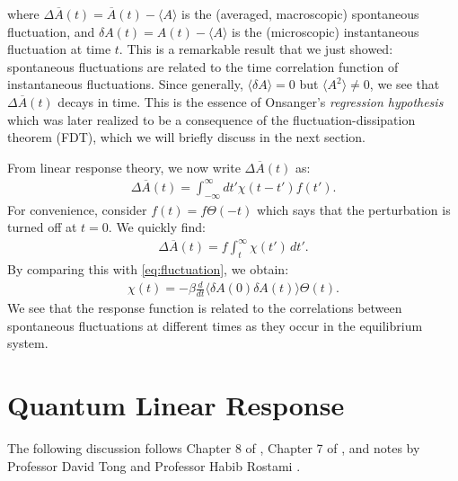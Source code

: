 \documentclass[prl,
twocolumn,
nofootinbib,
amsmath,amssymb,
aps]{revtex4-1}
\newcommand{\be}{\beta}
\newcommand{\f}[2]{\frac{#1}{#2}}
\begin{document}
where $\Delta \overline{A}(t) = \overline{A}(t) - \langle A \rangle$ is the (averaged, macroscopic) spontaneous fluctuation, and $\delta A(t) = A(t) - \langle A \rangle$ is the (microscopic) instantaneous fluctuation at time $t$. This is a remarkable result that we just showed: spontaneous fluctuations are related to the time correlation function of instantaneous fluctuations. Since generally, $\langle \delta A \rangle = 0$ but $\langle A^2 \rangle \neq 0$, we see that $\Delta \overline{A}(t)$ decays in time. This is the essence of Onsanger's \textit{regression hypothesis} which was later realized to be a consequence of the fluctuation-dissipation theorem (FDT), which we will briefly discuss in the next section.

From linear response theory, we now write $\Delta \overline{A}(t)$ as:
\begin{align}
\label{eq:fluctuation_response_function}
\Delta \overline{A}(t) = \int_{-\infty}^\infty dt' \chi(t-t') f(t'). 
\end{align}
For convenience, consider $f(t) = f \Theta(-t)$ which says that the perturbation is turned off at $t=0$. We quickly find:
\begin{align*}
\Delta \overline{A}(t) = f \int_{t}^\infty \chi(t') \,dt'.
\end{align*}
By comparing this with \eqref{eq:fluctuation}, we obtain:
\begin{align*}
\chi(t) = -\be \f{d}{dt} \langle \delta A(0) \delta A(t) \rangle \Theta(t).
\end{align*}
We see that the response function is related to the correlations between spontaneous fluctuations at different times as they occur in the equilibrium system.


%
\section{Quantum Linear Response}\label{sec:quantum}

The following discussion follows Chapter 8 of \cite{chandler1988introduction}, Chapter 7 of \cite{chaikin1995principles}, and notes by Professor David Tong \cite{tong2012kinetic} and Professor Habib Rostami \cite{rostamilecture}.
\end{document}
